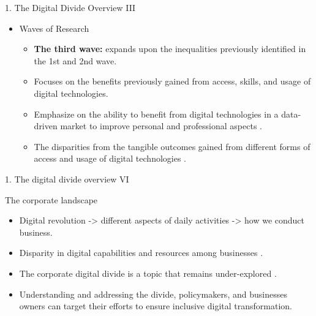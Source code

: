 \documentclass[
  ignorenonframetext,
]{beamer}
\providecommand{\tightlist}{%
  \setlength{\itemsep}{0pt}\setlength{\parskip}{0pt}}
\begin{document}
\begin{frame}{1. The Digital Divide Overview III}
\protect\hypertarget{the-digital-divide-overview-iii}{}
\begin{itemize}
\tightlist
\item
  Waves of Research

  \begin{itemize}
  \item
    \textbf{The third wave:} expands upon the inequalities previously
    identified in the 1st and 2nd wave.
  \item
    Focuses on the benefits previously gained from access, skills, and
    usage of digital technologies.
  \item
    Emphasize on the ability to benefit from digital technologies in a
    data-driven market to improve personal and professional aspects
    \citep{ragnedda2017}.
  \item
    The disparities from the tangible outcomes gained from different
    forms of access and usage of digital technologies
    \citep{vandeursen2015}.
  \end{itemize}
\end{itemize}
\end{frame}

\begin{frame}{1. The digital divide overview VI}
\protect\hypertarget{the-digital-divide-overview-vi}{}
\begin{block}{The corporate landscape}
\protect\hypertarget{the-corporate-landscape}{}
\begin{itemize}
\tightlist
\item
  Digital revolution -\textgreater{} different aspects of daily
  activities -\textgreater{} how we conduct business.
\item
  Disparity in digital capabilities and resources among businesses
  \citep{shakina2021}.
\item
  The corporate digital divide is a topic that remains under-explored
  \citep{pejicbach2013, shakina2021}.
\item
  Understanding and addressing the divide, policymakers, and businesses
  owners can target their efforts to ensure inclusive digital
  transformation.
\end{itemize}
\end{block}
\end{frame}
\end{document}
